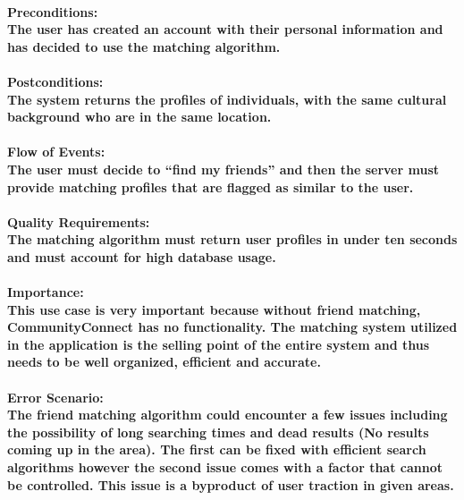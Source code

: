\documentclass[12pt]{article}
\begin{document}
			\paragraph{\normalfont \textbf{Preconditions:}\\The user has created an account with their personal information and has decided to use the matching algorithm.
			}
			\paragraph{\normalfont \textbf{Postconditions:}\\The system returns the profiles of individuals, with the same cultural background who are in the same location.
			}
			\paragraph{\normalfont \textbf{Flow of Events:}\\The user must decide to “find my friends” and then the server must provide matching profiles that are flagged as similar to the user.
			}
			\paragraph{\normalfont \textbf{Quality Requirements:}\\The matching algorithm must return user profiles in under ten seconds and must account for high database usage.
			}
			\paragraph{\normalfont \textbf{Importance:}\\This use case is very important because without friend matching, CommunityConnect has no functionality. The matching system utilized in the application is the selling point of the entire system and thus needs to be well organized, efficient and accurate.
			}
			\paragraph{\normalfont \textbf{Error Scenario:}\\The friend matching algorithm could encounter a few issues including the possibility of long searching times and dead results (No results coming up in the area). The first can be fixed with efficient search algorithms however the second issue comes with a factor that cannot be controlled. This issue is a byproduct of user traction in given areas.
			}
	
\end{document}
